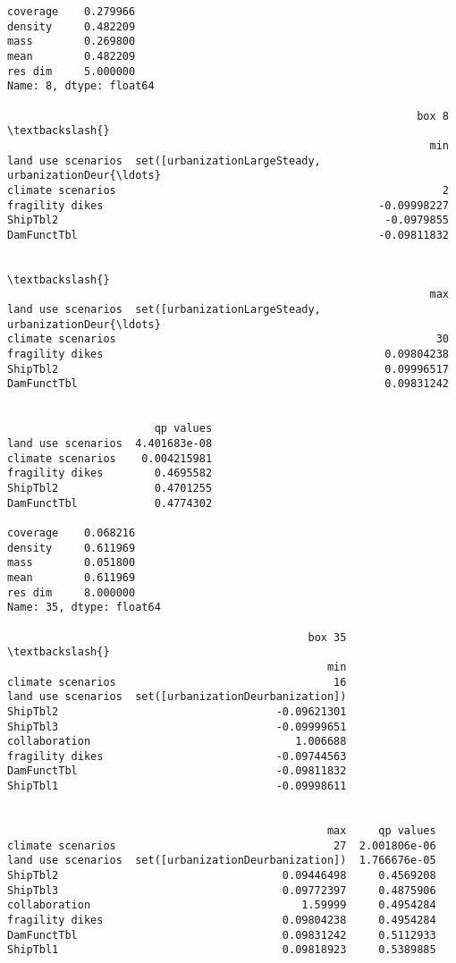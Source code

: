 \documentclass{article}
\begin{document}
    \begin{Verbatim}[commandchars=\\\{\}]
coverage    0.279966
density     0.482209
mass        0.269800
mean        0.482209
res dim     5.000000
Name: 8, dtype: float64

                                                                box 8  \textbackslash{}
                                                                  min   
land use scenarios  set([urbanizationLargeSteady, urbanizationDeur{\ldots}   
climate scenarios                                                   2   
fragility dikes                                           -0.09998227   
ShipTbl2                                                   -0.0979855   
DamFunctTbl                                               -0.09811832   

                                                                       \textbackslash{}
                                                                  max   
land use scenarios  set([urbanizationLargeSteady, urbanizationDeur{\ldots}   
climate scenarios                                                  30   
fragility dikes                                            0.09804238   
ShipTbl2                                                   0.09996517   
DamFunctTbl                                                0.09831242   

                                  
                       qp values  
land use scenarios  4.401683e-08  
climate scenarios    0.004215981  
fragility dikes        0.4695582  
ShipTbl2               0.4701255  
DamFunctTbl            0.4774302  

coverage    0.068216
density     0.611969
mass        0.051800
mean        0.611969
res dim     8.000000
Name: 35, dtype: float64

                                               box 35  \textbackslash{}
                                                  min   
climate scenarios                                  16   
land use scenarios  set([urbanizationDeurbanization])   
ShipTbl2                                  -0.09621301   
ShipTbl3                                  -0.09999651   
collaboration                                1.006688   
fragility dikes                           -0.09744563   
DamFunctTbl                               -0.09811832   
ShipTbl1                                  -0.09998611   

                                                                     
                                                  max     qp values  
climate scenarios                                  27  2.001806e-06  
land use scenarios  set([urbanizationDeurbanization])  1.766676e-05  
ShipTbl2                                   0.09446498     0.4569208  
ShipTbl3                                   0.09772397     0.4875906  
collaboration                                 1.59999     0.4954284  
fragility dikes                            0.09804238     0.4954284  
DamFunctTbl                                0.09831242     0.5112933  
ShipTbl1                                   0.09818923     0.5389885
    \end{Verbatim}
\end{document}

